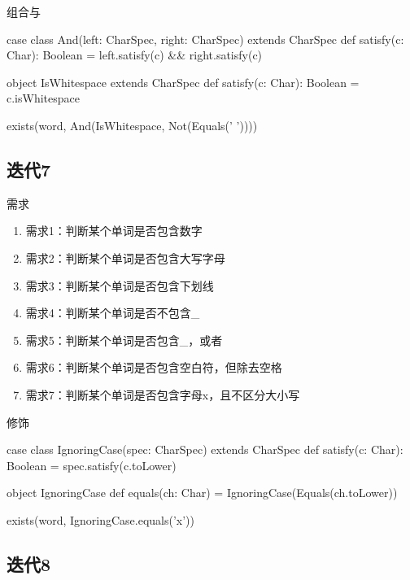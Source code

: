 \begin{frame}[fragile]{组合与}
  \begin{scala}
case class And(left: CharSpec, right: CharSpec) extends CharSpec {
  def satisfy(c: Char): Boolean = 
    left.satisfy(c) && right.satisfy(c)
}

object IsWhitespace extends CharSpec {
  def satisfy(c: Char): Boolean = c.isWhitespace
}

exists(word, And(IsWhitespace, Not(Equals(' '))))
  \end{scala}
\end{frame}

\subsection{迭代7}

\begin{frame}{需求}
  \begin{block}{}
    \begin{enumerate}
    \item \alert{需求1}：判断某个单词是否包含数字
    \item \alert{需求2}：判断某个单词是否包含大写字母
    \item \alert{需求3}：判断某个单词是否包含下划线 
    \item \alert{需求4}：判断某个单词是否不包含\_
    \item \alert{需求5}：判断某个单词是否包含\_，或者\*     
    \item \alert{需求6}：判断某个单词是否包含空白符，但除去空格
    \item<alert@1-> 需求7：判断某个单词是否包含字母x，且不区分大小写
    \end{enumerate}
  \end{block}
\end{frame}

\begin{frame}[fragile]{修饰}
  \begin{scala}
case class IgnoringCase(spec: CharSpec) extends CharSpec {
  def satisfy(c: Char): Boolean = spec.satisfy(c.toLower)
}

object IgnoringCase {
  def equals(ch: Char) = IgnoringCase(Equals(ch.toLower))
}

exists(word, IgnoringCase.equals('x'))
  \end{scala}
\end{frame}

\subsection{迭代8}

